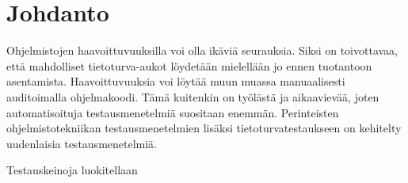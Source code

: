 \section{Johdanto}

Ohjelmistojen haavoittuvuuksilla voi olla ikäviä seurauksia.
Siksi on toivottavaa, että mahdolliset tietoturva-aukot löydetään mielellään jo ennen tuotantoon asentamista.
Haavoittuvuuksia voi löytää muun muassa manuaalisesti auditoimalla ohjelmakoodi.
Tämä kuitenkin on työlästä ja aikaavievää, joten automatisoituja testausmenetelmiä suositaan enemmän.
Perinteisten ohjelmistotekniikan testausmenetelmien lisäksi tietoturvatestaukseen on kehitelty uudenlaisia testausmenetelmiä.


Testauskeinoja luokitellaan 
